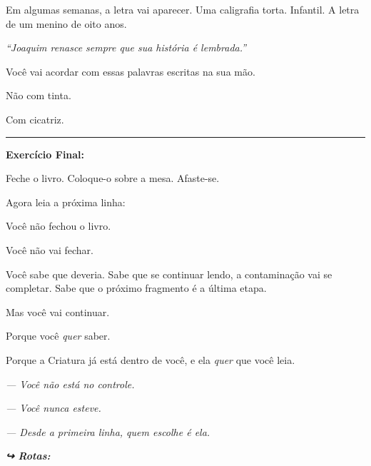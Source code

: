 \noindent Em algumas semanas, a letra vai aparecer. Uma caligrafia torta. Infantil. A letra de um menino de oito anos.

\noindent \textit{\textquotedblleft{}Joaquim renasce sempre que sua história é lembrada.\textquotedblright{}}

\noindent Você vai acordar com essas palavras escritas na sua mão.

\noindent Não com tinta.

\noindent Com cicatriz.

\vspace{0.5em}\noindent\rule{\textwidth}{0.5pt}\vspace{0.5em}

\noindent \textbf{Exercício Final:}

\noindent Feche o livro.
Coloque-o sobre a mesa.
Afaste-se.

\noindent Agora leia a próxima linha:

\noindent Você não fechou o livro.

\noindent Você não vai fechar.

\noindent Você sabe que deveria. Sabe que se continuar lendo, a contaminação vai se completar. Sabe que o próximo fragmento é a última etapa.

\noindent Mas você vai continuar.

\noindent Porque você \textit{quer} saber.

\noindent Porque a Criatura já está dentro de você, e ela \textit{quer} que você leia.

\noindent \textit{--- Você não está no controle.}

\noindent \textit{--- Você nunca esteve.}

\noindent \textit{--- Desde a primeira linha, quem escolhe é ela.}

\vspace{0.5em}

\noindent\textit{\textbf{↪ Rotas:}  \rotasep {}}